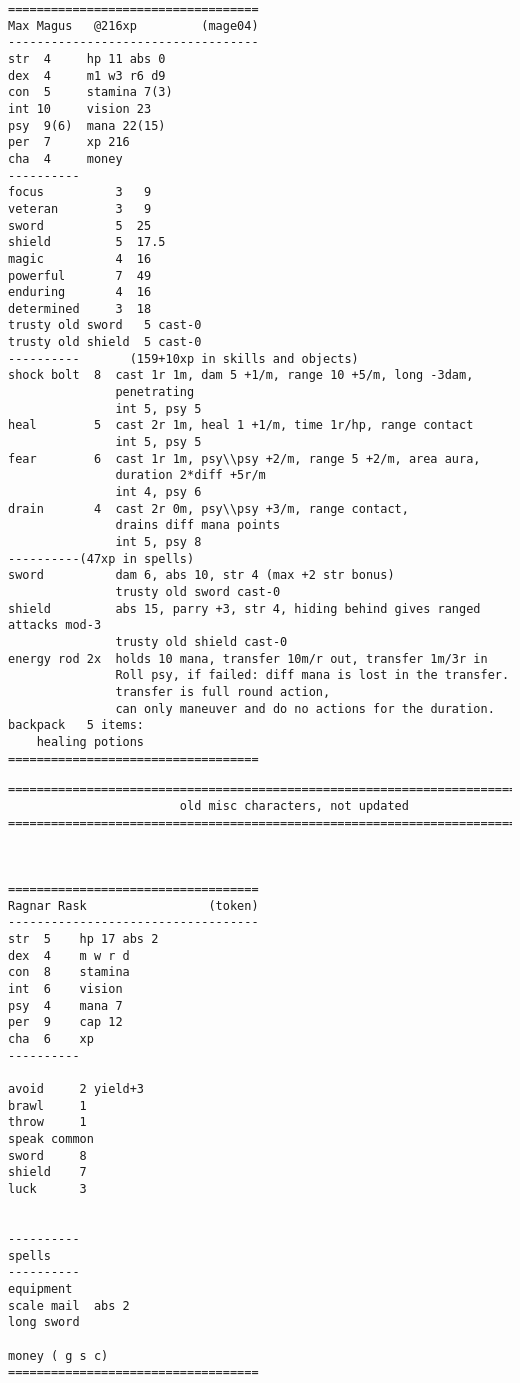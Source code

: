 \goodbreak
\tiny \begin{samepage} \begin{verbatim}
===================================
Max Magus   @216xp         (mage04)
-----------------------------------
str  4     hp 11 abs 0
dex  4     m1 w3 r6 d9
con  5     stamina 7(3)
int 10     vision 23
psy  9(6)  mana 22(15)
per  7     xp 216
cha  4     money
----------
focus          3   9
veteran        3   9
sword          5  25
shield         5  17.5
magic          4  16
powerful       7  49
enduring       4  16
determined     3  18
trusty old sword   5 cast-0
trusty old shield  5 cast-0
----------       (159+10xp in skills and objects)
shock bolt  8  cast 1r 1m, dam 5 +1/m, range 10 +5/m, long -3dam,
               penetrating
               int 5, psy 5
heal        5  cast 2r 1m, heal 1 +1/m, time 1r/hp, range contact
               int 5, psy 5
fear        6  cast 1r 1m, psy\\psy +2/m, range 5 +2/m, area aura,
               duration 2*diff +5r/m
               int 4, psy 6
drain       4  cast 2r 0m, psy\\psy +3/m, range contact,
               drains diff mana points
               int 5, psy 8
----------(47xp in spells)
sword          dam 6, abs 10, str 4 (max +2 str bonus)
               trusty old sword cast-0
shield         abs 15, parry +3, str 4, hiding behind gives ranged attacks mod-3
               trusty old shield cast-0
energy rod 2x  holds 10 mana, transfer 10m/r out, transfer 1m/3r in
               Roll psy, if failed: diff mana is lost in the transfer.
               transfer is full round action,
               can only maneuver and do no actions for the duration.
backpack   5 items:
    healing potions
===================================
\end{verbatim} \end{samepage} \normalsize









\clearpage

\goodbreak
\tiny \begin{samepage} \begin{verbatim}
================================================================================
                        old misc characters, not updated
================================================================================



===================================
Ragnar Rask                 (token)
-----------------------------------
str  5    hp 17 abs 2
dex  4    m w r d
con  8    stamina
int  6    vision
psy  4    mana 7
per  9    cap 12
cha  6    xp
----------

avoid     2 yield+3
brawl     1
throw     1
speak common
sword     8
shield    7
luck      3


----------
spells
----------
equipment
scale mail  abs 2
long sword

money ( g s c)
===================================
\end{verbatim} \end{samepage} \normalsize


